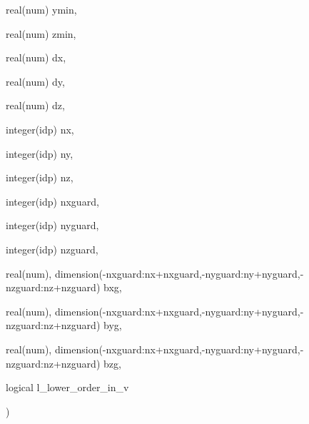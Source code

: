 {\begin{DoxyParamCaption}
\item[{real(num)}]{ymin, }
\item[{real(num)}]{zmin, }
\item[{real(num)}]{dx, }
\item[{real(num)}]{dy, }
\item[{real(num)}]{dz, }
\item[{integer(idp)}]{nx, }
\item[{integer(idp)}]{ny, }
\item[{integer(idp)}]{nz, }
\item[{integer(idp)}]{nxguard, }
\item[{integer(idp)}]{nyguard, }
\item[{integer(idp)}]{nzguard, }
\item[{real(num), dimension(-\/nxguard\+:nx+nxguard,-\/nyguard\+:ny+nyguard,-\/nzguard\+:nz+nzguard)}]{bxg, }
\item[{real(num), dimension(-\/nxguard\+:nx+nxguard,-\/nyguard\+:ny+nyguard,-\/nzguard\+:nz+nzguard)}]{byg, }
\item[{real(num), dimension(-\/nxguard\+:nx+nxguard,-\/nyguard\+:ny+nyguard,-\/nzguard\+:nz+nzguard)}]{bzg, }
\item[{logical}]{l\+\_\+lower\+\_\+order\+\_\+in\+\_\+v}
\end{DoxyParamCaption}
)}\hypertarget{field__gathering__3d__o3_8_f90_af2124c863ea5023482442eca03daff98}{}\label{field__gathering__3d__o3_8_f90_af2124c863ea5023482442eca03daff98}
